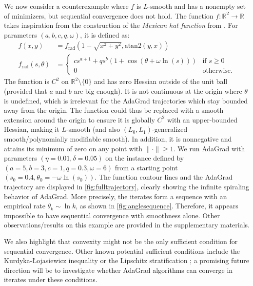 \documentclass{article}
\theoremstyle{plain}
\theoremstyle{definition}
\theoremstyle{remark}
\newcommand{\norm}[1]{\| #1 \|}
\newcommand*{\RR}{\mathbb{R}}
\begin{document}
We now consider a counterexample where $f$ is $L$-smooth and has a nonempty set of minimizers, but sequential convergence does not hold.  
The function $f: \RR^2 \to \RR $ takes inspiration from the construction of the \emph{Mexican hat function} from \citet{absil2005convergence}.
For parameters $(a, b, c, q, \omega)$, it is defined as:
\begin{align}
f(x, y) &= f_{\mathrm{rad}}( 1 - \sqrt{x^2 + y^2}, \mathrm{atan2}(y, x) ) \\
f_{\mathrm{rad}}( s, \theta ) &= 
\begin{cases}
    c s^{a+1} + q s^b (1 + \cos(\theta + \omega  \ln(s))) & \text{if } s \geq 0 \\
    0 & \text{otherwise.}
\end{cases}\nonumber
\end{align}
The function is $C^2$ on $\RR^2 \setminus \{0\}$ and has zero Hessian outside of the unit ball (provided that $a$ and $b$ are big enough).
It is not continuous at the origin where $\theta$ is undefined, which is irrelevant for the AdaGrad trajectories which stay bounded away from the origin.
The function could thus be replaced with a smooth extension around the origin to ensure it is globally $C^2$ with an upper-bounded Hessian,
making it $L$-smooth (and also $(L_0,L_1)$-generalized smooth/polynomially modifiable smooth).
In addition, it is nonnegative and attains its minimum of zero on any point with $\norm{\cdot} \geq 1$.
We run AdaGrad with parameters $(\eta=0.01, \delta=0.05)$
on the instance defined by $(a  = 5, b  = 3, c  = 1, q  = 0.3, \omega = 6)$ from a starting point
$(s_0=0.4, \theta_0 = -\omega \ln(s_0))$.
The function contour lines and the AdaGrad trajectory are displayed in \cref{fig:fulltrajectory}, clearly showing the infinite spiraling behavior of AdaGrad.
More precisely, the iterates form a sequence with an empirical rate $\theta_k \sim \ln k$,
as shown in \cref{fig:anglesequence}. Therefore, it appears impossible to have sequential convergence with smoothness alone. Other observations/results on this example are provided in the supplementary materials. \newline

We also highlight that convexity might not be the only sufficient condition for sequential convergence. Other known potential sufficient conditions include the Kurdyka-\L ojasiewicz inequality \cite{absil2005convergence,attouch2005convergence} or the Lipschitz stratification \cite{lai2026diametersubgradientsequencesominimal,chzhen2026convergenceratessubgradientdescent}; a promising future direction will be to investigate whether AdaGrad algorithms can converge in iterates under these conditions.
\end{document}
